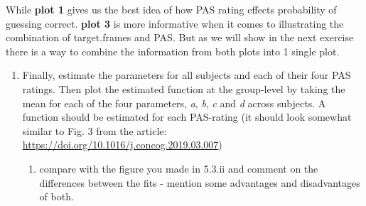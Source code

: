 \documentclass[
]{article}
\providecommand{\tightlist}{%
  \setlength{\itemsep}{0pt}\setlength{\parskip}{0pt}}
\begin{document}
While \textbf{plot 1} gives us the best idea of how PAS rating effects
probability of guessing correct. \textbf{plot 3} is more informative
when it comes to illustrating the combination of target.frames and PAS.
But as we will show in the next exercise there is a way to combine the
information from both plots into 1 single plot.

\begin{enumerate}
\def\labelenumi{\arabic{enumi})}
\setcounter{enumi}{1}
\item
  Finally, estimate the parameters for all subjects and each of their
  four PAS ratings. Then plot the estimated function at the group-level
  by taking the mean for each of the four parameters, \emph{a},
  \emph{b}, \emph{c} and \emph{d} across subjects. A function should be
  estimated for each PAS-rating (it should look somewhat similar to Fig.
  3 from the article:
  \url{https://doi.org/10.1016/j.concog.2019.03.007})

  \begin{enumerate}
  \def\labelenumii{\roman{enumii}.}
  \tightlist
  \item
    compare with the figure you made in 5.3.ii and comment on the
    differences between the fits - mention some advantages and
    disadvantages of both.
  \end{enumerate}
\end{enumerate}
\end{document}

